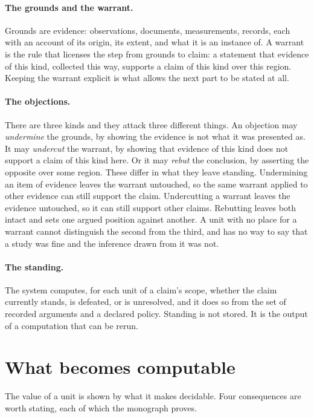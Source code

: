 \documentclass[11pt]{article}
\begin{document}
\paragraph{The grounds and the warrant.} Grounds are evidence: observations, documents, measurements, records, each with an account of its origin, its extent, and what it is an instance of. A warrant is the rule that licenses the step from grounds to claim: a statement that evidence of this kind, collected this way, supports a claim of this kind over this region. Keeping the warrant explicit is what allows the next part to be stated at all.

\paragraph{The objections.} There are three kinds and they attack three different things. An objection may \emph{undermine} the grounds, by showing the evidence is not what it was presented as. It may \emph{undercut} the warrant, by showing that evidence of this kind does not support a claim of this kind here. Or it may \emph{rebut} the conclusion, by asserting the opposite over some region. These differ in what they leave standing. Undermining an item of evidence leaves the warrant untouched, so the same warrant applied to other evidence can still support the claim. Undercutting a warrant leaves the evidence untouched, so it can still support other claims. Rebutting leaves both intact and sets one argued position against another. A unit with no place for a warrant cannot distinguish the second from the third, and has no way to say that a study was fine and the inference drawn from it was not.

\paragraph{The standing.} The system computes, for each unit of a claim's scope, whether the claim currently stands, is defeated, or is unresolved, and it does so from the set of recorded arguments and a declared policy. Standing is not stored. It is the output of a computation that can be rerun.

\section{What becomes computable}\label{sec:computable}

The value of a unit is shown by what it makes decidable. Four consequences are worth stating, each of which the monograph proves.
\end{document}
